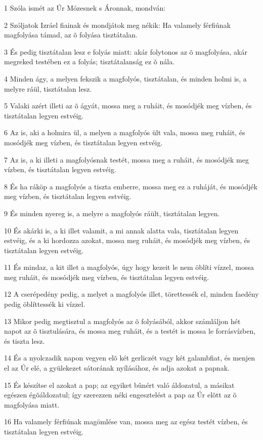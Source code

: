 \par 1 Szóla ismét az Úr Mózesnek s Áronnak, mondván:
\par 2 Szóljatok Izráel fiainak és mondjátok meg nékik: Ha valamely férfiúnak magfolyása támad, az õ folyása tisztátalan.
\par 3 És pedig tisztátalan lesz e folyás miatt: akár folytonos az õ magfolyása, akár megreked testében ez a folyás; tisztátalanság ez õ nála.
\par 4 Minden ágy, a melyen fekszik a magfolyós, tisztátalan, és minden holmi is, a melyre ráül, tisztátalan lesz.
\par 5 Valaki azért illeti az õ ágyát, mossa meg a ruháit, és mosódjék meg vízben, és tisztátalan legyen estvéig.
\par 6 Az is, aki a holmira ül, a melyen a magfolyós ült vala, mossa meg ruháit, és mosódjék meg vízben, és tisztátalan legyen estvéig.
\par 7 Az is, a ki illeti a magfolyósnak testét, mossa meg a ruháit, és mosódjék meg vízben, és tisztátalan legyen estvéig.
\par 8 És ha ráköp a magfolyós a tiszta emberre, mossa meg ez a ruháját, és mosódjék meg vízben, és tisztátalan legyen estvéig.
\par 9 És minden nyereg is, a melyre a magfolyós ráült, tisztátalan legyen.
\par 10 És akárki is, a ki illet valamit, a mi annak alatta vala, tisztátalan legyen estvéig, és a ki hordozza azokat, mossa meg ruháit, és mosódjék meg vízben, és tisztátalan legyen estvéig.
\par 11 És mindaz, a kit illet a magfolyós, úgy hogy kezeit le nem öblíti vízzel, mossa meg ruháit, és mosódjék meg vízben, és tisztátalan legyen estvéig.
\par 12 A cserépedény pedig, a melyet a magfolyós illet, törettessék el, minden faedény pedig öblíttessék ki vízzel.
\par 13 Mikor pedig megtisztul a magfolyós az õ folyásából, akkor számláljon hét napot az õ tisztulására, és mossa meg ruháit, és a testét is mossa le forrásvízben, és tiszta lesz.
\par 14 És a nyolczadik napon vegyen elõ két gerliczét vagy két galambfiat, és menjen el az Úr elé, a gyülekezet sátorának nyílásához, és adja azokat a papnak.
\par 15 És készítse el azokat a pap; az egyiket bûnért való áldozatul, a másikat egészen égõáldozatul; így szerezzen néki engesztelést a pap az Úr elõtt az õ magfolyása miatt.
\par 16 Ha valamely férfiúnak magömlése van, mossa meg az egész testét vízben, és tisztátalan legyen estvéig.
